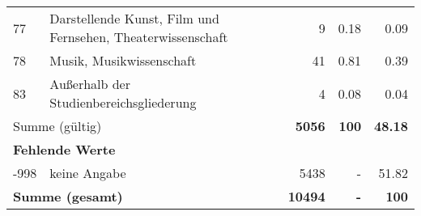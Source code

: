 \begin{longtable}{lXrrr}
        77 & \multicolumn{1}{X}{Darstellende Kunst, Film und Fernsehen, Theaterwissenschaft} & %
          \num{9} &
          \num[round-mode=places,round-precision=2]{0,18} &
          \num[round-mode=places,round-precision=2]{0,09} \\

        78 & \multicolumn{1}{X}{Musik, Musikwissenschaft} & %
          \num{41} &
          \num[round-mode=places,round-precision=2]{0,81} &
          \num[round-mode=places,round-precision=2]{0,39} \\

        83 & \multicolumn{1}{X}{Außerhalb der Studienbereichsgliederung} & %
          \num{4} &
          \num[round-mode=places,round-precision=2]{0,08} &
          \num[round-mode=places,round-precision=2]{0,04} \\

     \midrule
     \multicolumn{2}{l}{Summe (gültig)} &
       \textbf{\num{5056}} &
     \textbf{100} &
       \textbf{\num[round-mode=places,round-precision=2]{48,18}} \\
     \multicolumn{5}{l}{\textbf{Fehlende Werte}}\\
       -998 &
       keine Angabe &
         \num{5438} &
        - &
         \num[round-mode=places,round-precision=2]{51,82} \\
     \midrule
     \multicolumn{2}{l}{\textbf{Summe (gesamt)}} &
          \textbf{\num{10494}} &
        \textbf{-} &
        \textbf{100} \\
     \bottomrule
     \end{longtable}
     
